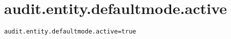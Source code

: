 \section{audit.entity.defaultmode.active}
\label{configuration:AuditEntityDefaultmodeActive}
\ClearAPI
\TODO
{}
\begin{lstlisting}[style=Props,caption={Usage example for \textit{audit.entity.defaultmode.active}}]
audit.entity.defaultmode.active=true
\end{lstlisting}